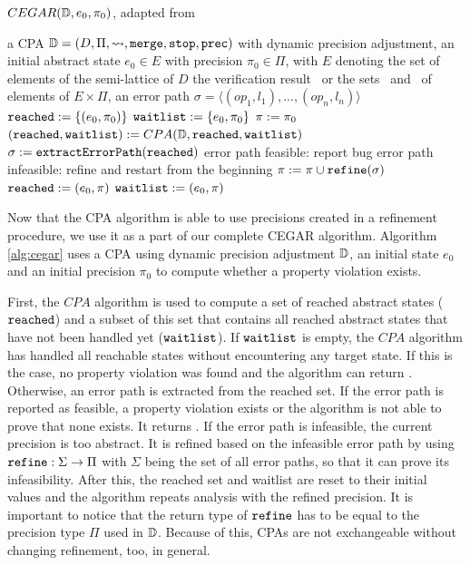 \begin{algorithm}[t]
\caption{$CEGAR(\mathbb{D}, e_0, \pi_0)$, adapted from \cite{Beyer2013}}
\label{alg:cegar}
\begin{algorithmic}[1]
\Input a CPA $\mathbb{D} = (D, \Pi, \rightsquigarrow, \texttt{merge}, \texttt{stop}, \texttt{prec})$ with dynamic precision adjustment,
	an initial abstract state $e_0 \in E$ with precision $\pi_0 \in \Pi$,
	with $E$ denoting the set of elements of the semi-lattice of $D$
\Output the verification result \safe\ or \unsafe
\Variables the sets \reachedSet\ and \waitlistSet\ of elements of $E \times \Pi$,
	      an error path $\sigma = \langle (op_1, l_1), ..., (op_n, l_n) \rangle$\\

\State $\texttt{reached} := \{ (e_0, \pi_0) \}$
\State $\texttt{waitlist} := \{ e_0, \pi_0 \}$
\State $\pi := \pi_0$
	\State $(\texttt{reached}, \texttt{waitlist}) := CPA(\mathbb{D}, \texttt{reached}, \texttt{waitlist})$
	\If{$\waitlistSet = \varnothing$}
		\Return \safe
	\Else
		\State $\sigma := \texttt{extractErrorPath}(\texttt{reached})$ \label{alg:cegar:extraction}
		\If{\isFeasible{$\sigma$}} \Comment error path feasible: report bug \label{alg:cegar:feasibilityCheck}
			\State %
			\Return \unsafe 
		\Else \Comment error path infeasible: refine and restart from the beginning
			\State $\pi := \pi \cup \texttt{refine}(\sigma)$
			\State $\texttt{reached} := (e_0, \pi)$
			\State $\texttt{waitlist} := (e_0, \pi)$ \label{alg:cegar:end}
		\EndIf
	\EndIf
\EndWhile
\end{algorithmic}
\end{algorithm}

Now that the CPA algorithm is able to use precisions created in a refinement procedure, we use it as a part of our complete CEGAR algorithm.
Algorithm \ref{alg:cegar} uses a CPA using dynamic precision adjustment $\mathbb{D}$,
an initial state $e_0$
and an initial precision $\pi_0$
to compute whether a property violation exists.

First, the $CPA$ algorithm is used to compute a set of reached abstract states ($\texttt{reached}$) and a subset of this set that contains all reached abstract states that have not been handled yet ($\texttt{waitlist}$).
If $\texttt{waitlist}$ is empty, the $CPA$ algorithm has handled all reachable states without encountering any target state.
If this is the case, no property violation was found and the algorithm can return \safe.
Otherwise, an error path is extracted from the reached set.
If the error path is reported as feasible, a property violation exists or the algorithm is not able to prove that none exists. It returns \unsafe.
If the error path is infeasible, the current precision is too abstract.
It is refined based on the infeasible error path by using $\texttt{refine} : \Sigma \rightarrow \Pi$ with $\Sigma$ being the set of all error paths, so that it can prove its infeasibility.
After this, the reached set and waitlist are reset to their initial values and the algorithm repeats analysis with the refined precision.
It is important to notice that the return type of $\texttt{refine}$ has to be equal to the precision type $\Pi$ used in $\mathbb{D}$.
Because of this, CPAs are not exchangeable without changing refinement, too, in general.

